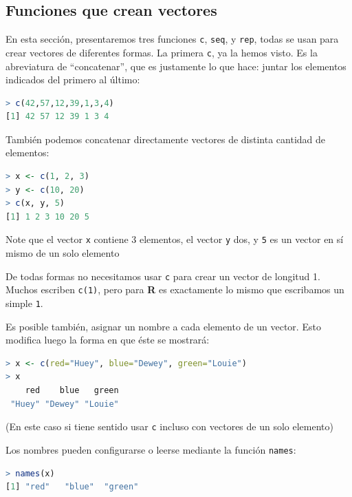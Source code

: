 \subsection{Funciones que crean vectores}

En esta sección, presentaremos tres funciones \texttt{c}, \texttt{seq}, y
\texttt{rep}, todas se usan para crear vectores de diferentes formas.  La
primera \texttt{c}, ya la hemos visto. Es la abreviatura de ``concatenar'', que
es justamente lo que hace: juntar los elementos indicados del primero al último:

\begin{lstlisting}[language=R]
> c(42,57,12,39,1,3,4)
[1] 42 57 12 39 1 3 4
\end{lstlisting}

También podemos concatenar directamente vectores de distinta cantidad de elementos:

\begin{lstlisting}[language=R]
> x <- c(1, 2, 3)
> y <- c(10, 20)
> c(x, y, 5)
[1] 1 2 3 10 20 5
\end{lstlisting}

\begin{tradnote} Note que el vector \texttt{x} contiene 3 elementos, el vector
\texttt{y} dos, y \texttt{5} es un vector en sí mismo de un solo elemento
\end{tradnote}

De todas formas no necesitamos usar \texttt{c} para crear un vector de longitud
1. Muchos escriben \texttt{c(1)}, pero para \textbf{R} es exactamente lo mismo
que escribamos un simple \texttt{1}.

Es posible también, asignar un nombre a cada elemento de un vector. Esto
modifica luego la forma en que éste se mostrará:

\begin{lstlisting}[language=R]
> x <- c(red="Huey", blue="Dewey", green="Louie")
> x
    red    blue   green
 "Huey" "Dewey" "Louie"
\end{lstlisting}

(En este caso si tiene sentido usar \texttt{c} incluso con vectores de un solo
elemento)

Los nombres pueden configurarse o leerse mediante la función \texttt{names}:

\begin{lstlisting}[language=R]
> names(x)
[1] "red"   "blue"  "green"
\end{lstlisting}

